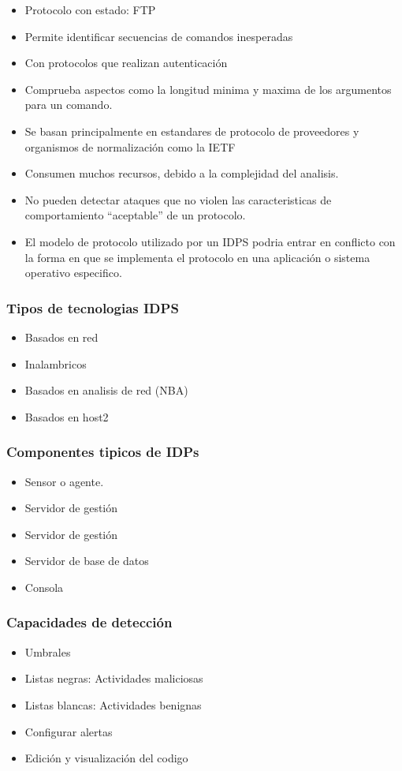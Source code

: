 \documentclass[11pt]{article}
\begin{document}
\begin{enumerate}
\begin{itemize}
\item Protocolo con estado: FTP

\item Permite identificar secuencias de comandos inesperadas
\item Con protocolos que realizan autenticación
\item Comprueba aspectos como la longitud minima y maxima de los argumentos para un comando.
\item Se basan principalmente en estandares de protocolo de proveedores y organismos de normalización como la IETF

\item Consumen muchos recursos, debido a la complejidad del analisis.
\item No pueden detectar ataques que no violen las caracteristicas de comportamiento ``aceptable'' de un protocolo.
\item El modelo de protocolo utilizado por un IDPS podria entrar en conflicto con la forma en que se implementa el protocolo en una aplicación o sistema operativo especifico.
\end{itemize}
\end{enumerate}
\subsubsection{Tipos de tecnologias IDPS}
\label{sec:org7f31daf}
\begin{itemize}
\item Basados en red
\item Inalambricos
\item Basados en analisis de red (NBA)
\item Basados en host2
\end{itemize}
\subsubsection{Componentes tipicos de IDPs}
\label{sec:org768fdaa}
\begin{itemize}
\item Sensor o agente.
\item Servidor de gestión
\item Servidor de gestión
\item Servidor de base de datos
\item Consola
\end{itemize}
\subsubsection{Capacidades de detección}
\label{sec:orgf0b49ae}
\begin{itemize}
\item Umbrales
\item Listas negras: Actividades maliciosas
\item Listas blancas: Actividades benignas
\item Configurar alertas
\item Edición y visualización del codigo
\end{itemize}
\end{document}
